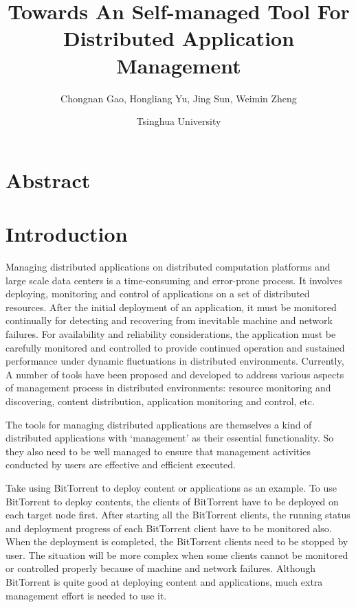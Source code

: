 \documentclass[10pt, twocolumn]{article}
\title{\bf \huge Towards An Self-managed Tool For Distributed
Application Management}
\author{Chongnan Gao, Hongliang Yu, Jing Sun, Weimin Zheng}
\date{Tsinghua University}
\begin{document}
\maketitle

\section*{Abstract}


\section{Introduction}

Managing distributed applications on distributed computation
platforms \citep{Peterson2002, Foster2001} and large scale data
centers is a time-consuming and error-prone process.  It
involves deploying, monitoring and control of applications on a
set of distributed resources.  After the initial deployment of
an application, it must be monitored continually for detecting
and recovering from inevitable machine and network failures. For
availability and reliability considerations, the application
must be carefully monitored and controlled to provide continued
operation and sustained performance under dynamic fluctuations
in distributed environments. Currently, A number of tools have
been proposed and developed to address various aspects of
management process in distributed environments: resource
monitoring and discovering, content distribution, application
monitoring and control, etc.

\iffalse
They can
be categorized into two approaches: centralized approach and
peer-to-peer approach. While the centralized approach is easier
to design, develop and use, they cannot scale well for large
systems. The peer-to-peer approach scales better than the
centralized one.  And it can adapt to fluctuations in
distributed environment dynamically, if carefully designed.
\fi

The tools for managing distributed applications are themselves a
kind of distributed applications with `management' as their
essential functionality. So they also need to be well managed to
ensure that management activities conducted by users are
effective and efficient executed.

Take using BitTorrent to deploy content or applications as an
example. To use BitTorrent to deploy contents, the clients of
BitTorrent have to be deployed on each target node first.  After
starting all the BitTorrent clients, the running status and
deployment progress of each BitTorrent client have to be
monitored also.  When the deployment is completed, the
BitTorrent clients need to be stopped by user.  The situation
will be more complex when some clients cannot be monitored or
controlled properly because of machine and network failures.
Although BitTorrent is quite good at deploying content and
applications, much extra management effort is needed to use it.
\end{document}
